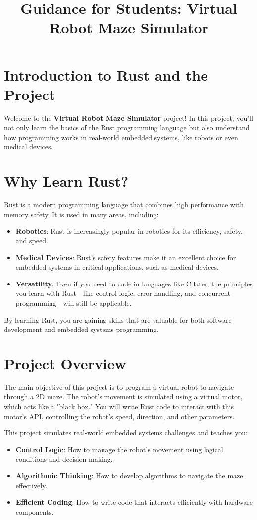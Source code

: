 \documentclass{article}
\title{Guidance for Students: Virtual Robot Maze Simulator}
\author{}
\date{}
\begin{document}
	
	\maketitle
	
	\section*{Introduction to Rust and the Project}
	
	Welcome to the \textbf{Virtual Robot Maze Simulator} project! In this project, you'll not only learn the basics of the Rust programming language but also understand how programming works in real-world embedded systems, like robots or even medical devices.
	
	\section*{Why Learn Rust?}
	Rust is a modern programming language that combines high performance with memory safety. It is used in many areas, including:
	\begin{itemize}
		\item \textbf{Robotics}: Rust is increasingly popular in robotics for its efficiency, safety, and speed.
		\item \textbf{Medical Devices}: Rust's safety features make it an excellent choice for embedded systems in critical applications, such as medical devices.
		\item \textbf{Versatility}: Even if you need to code in languages like C later, the principles you learn with Rust—like control logic, error handling, and concurrent programming—will still be applicable.
	\end{itemize}
	By learning Rust, you are gaining skills that are valuable for both software development and embedded systems programming.
	
	\section*{Project Overview}
	The main objective of this project is to program a virtual robot to navigate through a 2D maze. The robot's movement is simulated using a virtual motor, which acts like a "black box." You will write Rust code to interact with this motor's API, controlling the robot’s speed, direction, and other parameters.
	
	This project simulates real-world embedded systems challenges and teaches you:
	\begin{itemize}
		\item \textbf{Control Logic}: How to manage the robot’s movement using logical conditions and decision-making.
		\item \textbf{Algorithmic Thinking}: How to develop algorithms to navigate the maze effectively.
		\item \textbf{Efficient Coding}: How to write code that interacts efficiently with hardware components.
	\end{itemize}
	
\end{document}
